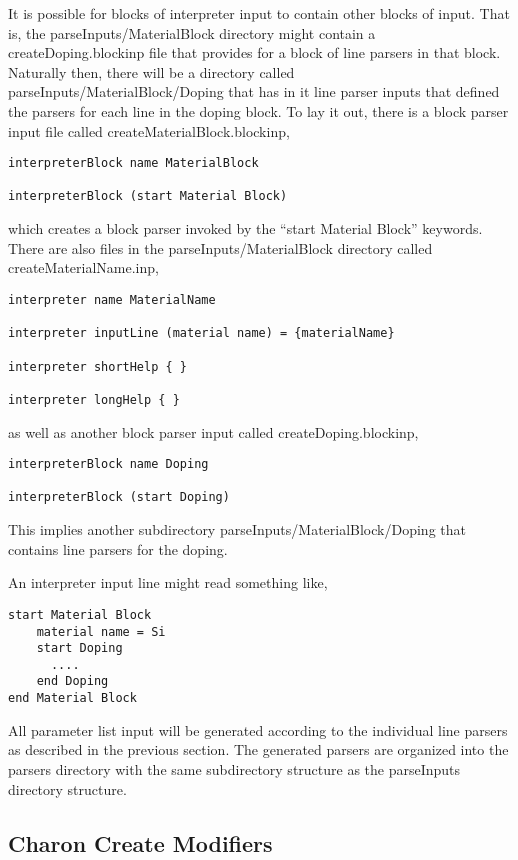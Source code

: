 It is possible for blocks of interpreter input to contain other blocks
of input.  That is, the parseInputs/MaterialBlock directory might
contain a createDoping.blockinp file that provides for a block of line
parsers in that block.  Naturally then, there will be a directory
called parseInputs/MaterialBlock/Doping that has in it line parser
inputs that defined the parsers for each line in the doping block.  To
lay it out, there is a block parser input file called
createMaterialBlock.blockinp,
\begin{lstlisting}
interpreterBlock name MaterialBlock

interpreterBlock (start Material Block)
\end{lstlisting}
which creates a block parser invoked by the ``start Material Block''
keywords.  There are also files in the parseInputs/MaterialBlock
directory called createMaterialName.inp,
\begin{lstlisting}
interpreter name MaterialName

interpreter inputLine (material name) = {materialName}

interpreter shortHelp { }

interpreter longHelp { }
\end{lstlisting}
as well as another block parser input called createDoping.blockinp,
\begin{lstlisting}
interpreterBlock name Doping

interpreterBlock (start Doping) 
\end{lstlisting}
This implies another subdirectory parseInputs/MaterialBlock/Doping
that contains line parsers for the doping.

An interpreter input line might read something like,
\begin{lstlisting}
start Material Block
    material name = Si
    start Doping
      ....
    end Doping
end Material Block
\end{lstlisting}
All parameter list input will be generated according to the individual
line parsers as described in the previous section.  The generated
parsers are organized into the parsers directory with the same
subdirectory structure as the parseInputs directory structure.



\subsection{Charon Create Modifiers}



